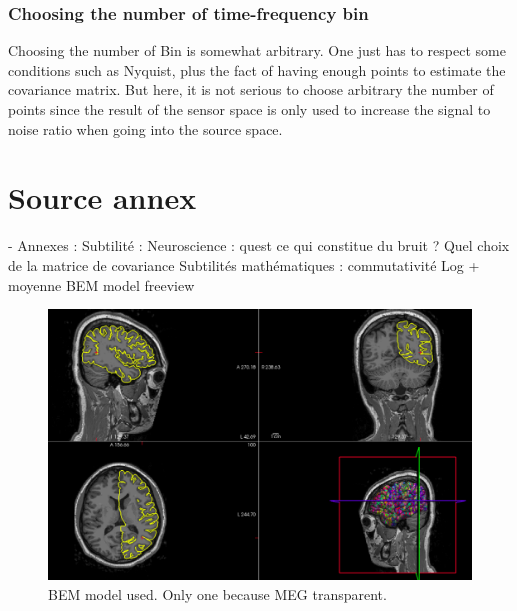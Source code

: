 \subsection{Choosing the number of time-frequency bin}

Choosing the number of Bin is somewhat arbitrary. One just has to respect some conditions such as Nyquist, plus the fact of having enough points to estimate the covariance matrix. But here, it is not serious to choose arbitrary the number of points since the result of the sensor space is only used to increase the signal to noise ratio when going into the source space.

\chapter{Source annex}

- Annexes : Subtilité :
Neuroscience : quest ce qui constitue du bruit ? Quel choix de la matrice de covariance
Subtilités mathématiques :  commutativité Log + moyenne
BEM model freeview



\begin{figure}[ht]
    \centering
    \includegraphics[width=15cm]{images_report/source/BEM_model_freeview_cropped.png}
    \caption[Segemntentation results visualized on Freeview.]%
    {BEM model used. Only one because MEG transparent.}
    \label{BEM_model_freeview_cropped}
\end{figure}
